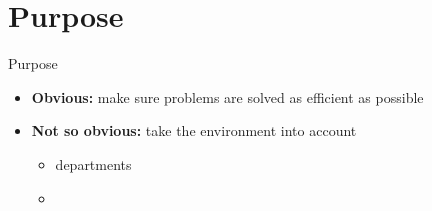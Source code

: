 \section{Purpose}
\begin{frame}{Purpose}

\begin{itemize}
	\item \textbf{Obvious:} make sure problems are solved as efficient as possible
	\item \textbf{Not so obvious:} take the environment into account
	\begin{itemize}
		\item departments
		\item 
	\end{itemize}
\end{itemize}


\end{frame}

